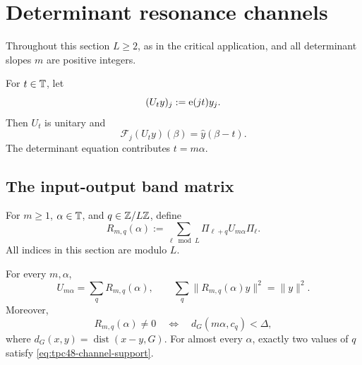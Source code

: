 \section{Determinant resonance channels}
\label{sec:tpc48-channels}

Throughout this section \(L\ge2\), as in the critical application, and
all determinant slopes \(m\) are positive integers.

For \(t\in\mathbb T\), let
\begin{equation}
 (U_ty)_j:=\mathrm e(jt)y_j.
 \label{eq:tpc48-modulation}
\end{equation}
Then \(U_t\) is unitary and
\begin{equation}
 \mathscr F_j(U_ty)(\beta)=\widehat y(\beta-t).
 \label{eq:tpc48-Fourier-translation}
\end{equation}
The determinant equation contributes \(t=m\alpha\).

\subsection{The input-output band matrix}

For \(m\ge1\), \(\alpha\in\mathbb T\), and \(q\in\mathbb Z/L\mathbb Z\), define
\begin{equation}
 R_{m,q}(\alpha)
 :=\sum_{\ell\bmod L}
 \Pi_{\ell+q}U_{m\alpha}\Pi_\ell.
 \label{eq:tpc48-channel-operator}
\end{equation}
All indices in this section are modulo \(L\).

\begin{theorem}
\label{thm:tpc48-channel-resolution}
For every \(m,\alpha\),
\begin{equation}
 U_{m\alpha}=\sum_qR_{m,q}(\alpha),
 \qquad
 \sum_q\|R_{m,q}(\alpha)y\|^2=\|y\|^2.
 \label{eq:tpc48-channel-resolution}
\end{equation}
Moreover,
\begin{equation}
 R_{m,q}(\alpha)\ne0
 \quad\Longleftrightarrow\quad
 d_G(m\alpha,c_q)<\Delta,
 \label{eq:tpc48-channel-support}
\end{equation}
where
\(d_G(x,y)=\operatorname{dist}(x-y,G)\).  For almost every \(\alpha\),
exactly two values of \(q\) satisfy
\eqref{eq:tpc48-channel-support}.
\end{theorem}

